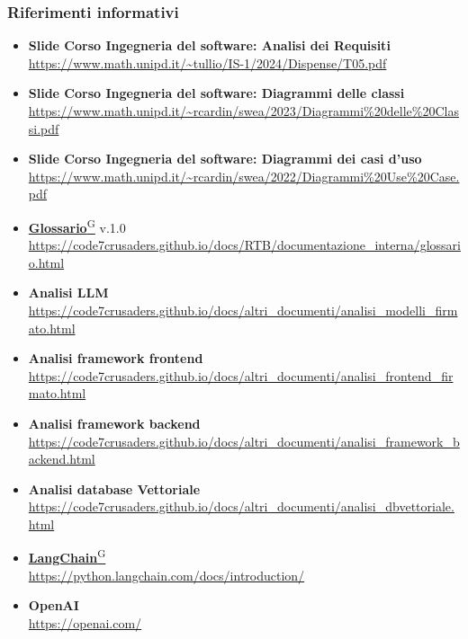 \subsubsection{Riferimenti informativi}
\begin{itemize}
    \item \textbf{Slide Corso Ingegneria del software: Analisi dei Requisiti} \\ \url{https://www.math.unipd.it/~tullio/IS-1/2024/Dispense/T05.pdf}
    \item \textbf{Slide Corso Ingegneria del software: Diagrammi delle classi} \\ \url{https://www.math.unipd.it/~rcardin/swea/2023/Diagrammi%20delle%20Classi.pdf}
    \item \textbf{Slide Corso Ingegneria del software: Diagrammi dei casi d'uso}\\ \url{https://www.math.unipd.it/~rcardin/swea/2022/Diagrammi%20Use%20Case.pdf}
    \item \href{https://code7crusaders.github.io/docs/PB/documentazione_interna/glossario.html#glossario}{\textbf{Glossario}\textsuperscript{G}} v.1.0 \\ \url{https://code7crusaders.github.io/docs/RTB/documentazione_interna/glossario.html}
    \item \textbf{Analisi LLM} \\ \url{https://code7crusaders.github.io/docs/altri_documenti/analisi_modelli_firmato.html}
    \item \textbf{Analisi framework frontend} \\ \url{https://code7crusaders.github.io/docs/altri_documenti/analisi_frontend_firmato.html}
    \item \textbf{Analisi framework backend} \\ \url{https://code7crusaders.github.io/docs/altri_documenti/analisi_framework_backend.html}
    \item \textbf{Analisi database Vettoriale} \\ \url{https://code7crusaders.github.io/docs/altri_documenti/analisi_dbvettoriale.html}
    \item \href{https://code7crusaders.github.io/docs/PB/documentazione_interna/glossario.html#langchain}{\textbf{LangChain}\textsuperscript{G}} \\ \url{https://python.langchain.com/docs/introduction/}
    \item \textbf{OpenAI} \\ \url{https://openai.com/}
\end{itemize}

